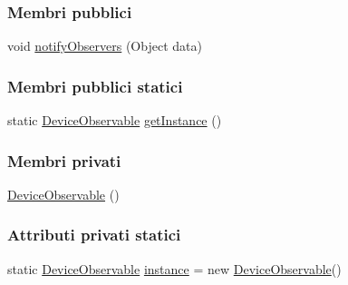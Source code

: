 \subsubsection*{Membri pubblici}
\begin{DoxyCompactItemize}
\item 
void \hyperlink{classit_1_1unibo_1_1torsello_1_1bluetoothpositioning_1_1observables_1_1DeviceObservable_aaf183e537e44cbd114c8eb76432da191_aaf183e537e44cbd114c8eb76432da191}{notify\+Observers} (Object data)
\end{DoxyCompactItemize}
\subsubsection*{Membri pubblici statici}
\begin{DoxyCompactItemize}
\item 
static \hyperlink{classit_1_1unibo_1_1torsello_1_1bluetoothpositioning_1_1observables_1_1DeviceObservable}{Device\+Observable} \hyperlink{classit_1_1unibo_1_1torsello_1_1bluetoothpositioning_1_1observables_1_1DeviceObservable_ab16792c5848440646624b2a41553954a_ab16792c5848440646624b2a41553954a}{get\+Instance} ()
\end{DoxyCompactItemize}
\subsubsection*{Membri privati}
\begin{DoxyCompactItemize}
\item 
\hyperlink{classit_1_1unibo_1_1torsello_1_1bluetoothpositioning_1_1observables_1_1DeviceObservable_afd89b681af0ee7708c8d3e830128cd2a_afd89b681af0ee7708c8d3e830128cd2a}{Device\+Observable} ()
\end{DoxyCompactItemize}
\subsubsection*{Attributi privati statici}
\begin{DoxyCompactItemize}
\item 
static \hyperlink{classit_1_1unibo_1_1torsello_1_1bluetoothpositioning_1_1observables_1_1DeviceObservable}{Device\+Observable} \hyperlink{classit_1_1unibo_1_1torsello_1_1bluetoothpositioning_1_1observables_1_1DeviceObservable_a43120f0ae1d6ae6c543219ec42df15e2_a43120f0ae1d6ae6c543219ec42df15e2}{instance} = new \hyperlink{classit_1_1unibo_1_1torsello_1_1bluetoothpositioning_1_1observables_1_1DeviceObservable}{Device\+Observable}()
\end{DoxyCompactItemize}


